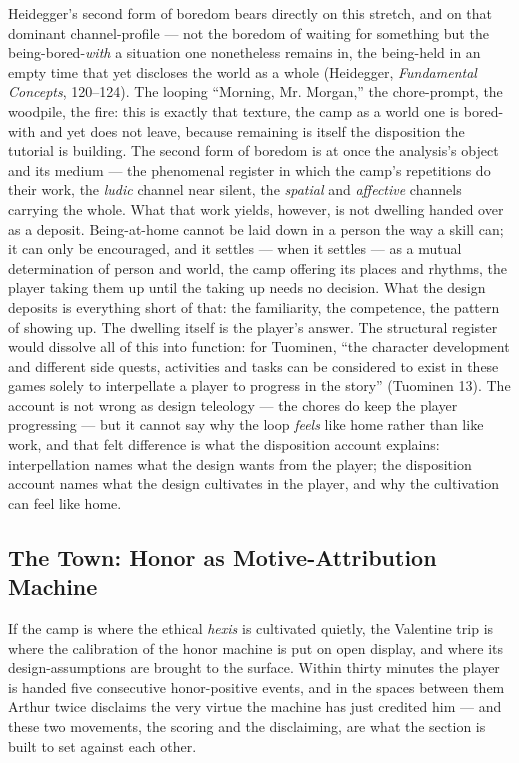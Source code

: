 \documentclass{article}
\begin{document}
Heidegger's second form of boredom bears directly on this stretch, and on that dominant channel-profile — not the boredom of waiting for something but the being-bored-\textit{with} a situation one nonetheless remains in, the being-held in an empty time that yet discloses the world as a whole (Heidegger, \textit{Fundamental Concepts}, 120–124). The looping ``Morning, Mr. Morgan,'' the chore-prompt, the woodpile, the fire: this is exactly that texture, the camp as a world one is bored-with and yet does not leave, because remaining is itself the disposition the tutorial is building. The second form of boredom is at once the analysis's object and its medium — the phenomenal register in which the camp's repetitions do their work, the \textit{ludic} channel near silent, the \textit{spatial} and \textit{affective} channels carrying the whole. What that work yields, however, is not dwelling handed over as a deposit. Being-at-home cannot be laid down in a person the way a skill can; it can only be encouraged, and it settles — when it settles — as a mutual determination of person and world, the camp offering its places and rhythms, the player taking them up until the taking up needs no decision. What the design deposits is everything short of that: the familiarity, the competence, the pattern of showing up. The dwelling itself is the player's answer.
The structural register would dissolve all of this into function: for Tuominen, ``the character development and different side quests, activities and tasks can be considered to exist in these games solely to interpellate a player to progress in the story'' (Tuominen 13). The account is not wrong as design teleology — the chores do keep the player progressing — but it cannot say why the loop \textit{feels} like home rather than like work, and that felt difference is what the disposition account explains: interpellation names what the design wants from the player; the disposition account names what the design cultivates in the player, and why the cultivation can feel like home.

\bigskip

\subsection*{The Town: Honor as Motive-Attribution Machine}

If the camp is where the ethical \textit{hexis} is cultivated quietly, the Valentine trip is where the calibration of the honor machine is put on open display, and where its design-assumptions are brought to the surface. Within thirty minutes the player is handed five consecutive honor-positive events, and in the spaces between them Arthur twice disclaims the very virtue the machine has just credited him — and these two movements, the scoring and the disclaiming, are what the section is built to set against each other.
\end{document}
